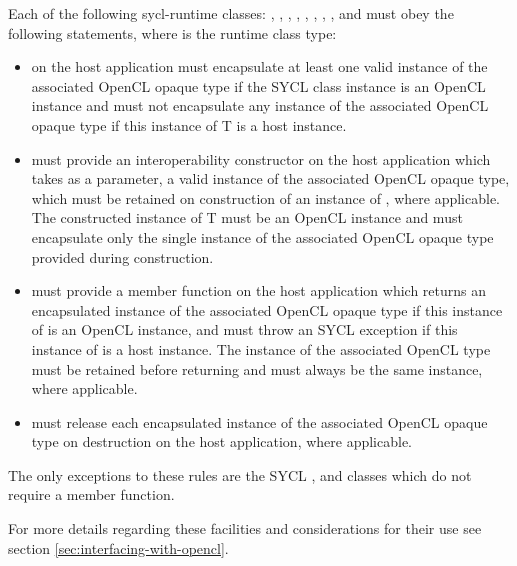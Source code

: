 Each of the following \gls{sycl-runtime} classes: ,
, , , , , , ,  and  must obey the following statements, where  is the runtime class type:

\begin{itemize}

\item {} on the host application must encapsulate at least one valid instance of the associated OpenCL opaque type if the SYCL class instance is an OpenCL instance and must not encapsulate any instance of the associated OpenCL opaque type if this instance of T is a host instance.

\item {} must provide an interoperability constructor on the host application which takes as a parameter, a valid instance of the associated OpenCL opaque type, which must be retained on construction of an instance of , where applicable. The constructed instance of T must be an OpenCL instance and must encapsulate only the single instance of the associated OpenCL opaque type provided during construction.

\item {} must provide a  member function on the host application which returns an encapsulated instance of the associated OpenCL opaque type if this instance of  is an OpenCL instance, and must throw an  SYCL exception if this instance of  is a host instance. The instance of the associated OpenCL type must be retained before returning and must always be the same instance, where applicable.

\item {} must release each encapsulated instance of the associated OpenCL opaque type on destruction on the host application, where applicable.

\end{itemize}

The only exceptions to these rules are the SYCL ,  and  classes which do not require a  member function.

For more details regarding these facilities and considerations for their use see section \ref{sec:interfacing-with-opencl}.

